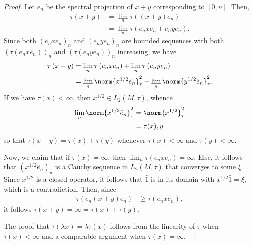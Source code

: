 \documentclass[10pt]{mypackage}
\begin{document}
\begin{proof}
  Let $e_n$ be the spectral projection of $x + y$ corresponding to $\left[ 0,n \right]$. Then,
  \begin{align*}
    \tau\left( x + y \right) &= \lim_{n} \tau\left( \left( x+y \right)e_n \right)\\
                             &= \lim_{n} \tau\left( e_nxe_n + e_nye_n \right).
  \end{align*}
  Since both $\left( e_nxe_n \right)_n$ and $\left( e_nye_n \right)_n$ are bounded sequences with both $\left( \tau\left( e_nxe_n \right) \right)_n$ and $\left( \tau\left( e_nye_n \right) \right)_{n}$ increasing, we have
  \begin{align*}
    \tau\left( x + y \right) &= \lim_{n}\tau\left( e_nxe_n \right) + \lim_{n}\tau\left( e_nye_n \right)\\
                             &= \lim_{n} \norm{x^{1/2}\hat{e}_n}_{\tau}^2 + \lim_{n}\norm{y^{1/2}\hat{e}_n}_{\tau}^{2}.
  \end{align*}
  If we have $\tau(x) < \infty$, then $x^{1/2}\in L_2\left( M,\tau \right)$, whence
  \begin{align*}
    \lim_{n} \norm{x^{1/2}\hat{e}_n}_{\tau}^2 &= \norm{x^{1/2}}_{\tau}^2\\
                                              &= \tau(x),y
  \end{align*}
  so that $\tau\left( x + y \right) = \tau\left( x \right) + \tau\left( y \right)$ whenever $\tau\left( x \right) < \infty$ and $\tau\left( y \right) < \infty$.

  Now, we claim that if $\tau\left( x \right) = \infty$, then $\lim_{n}\tau\left( e_nxe_n \right) = \infty$. Else, it follows that $\left( x^{1/2}\hat{e}_n \right)_{n}$ is a Cauchy sequence in $L_2\left( M,\tau \right)$ that converges to some $\xi$. Since $x^{1/2}$ is a closed operator, it follows that $\hat{1}$ is in its domain with $x^{1/2}\hat{1} = \xi$, which is a contradiction. Then, since
  \begin{align*}
    \tau\left( e_n\left( x + y \right)e_n \right) &\geq \tau\left( e_nxe_n \right),
  \end{align*}
  it follows $\tau\left( x + y \right) = \infty = \tau\left( x \right) + \tau\left( y \right)$.

  The proof that $\tau\left( \lambda x \right) = \lambda \tau(x)$ follows from the linearity of $\tau$ when $\tau(x) < \infty$ and a comparable argument when $\tau(x) = \infty$.


\end{proof}
\end{document}

